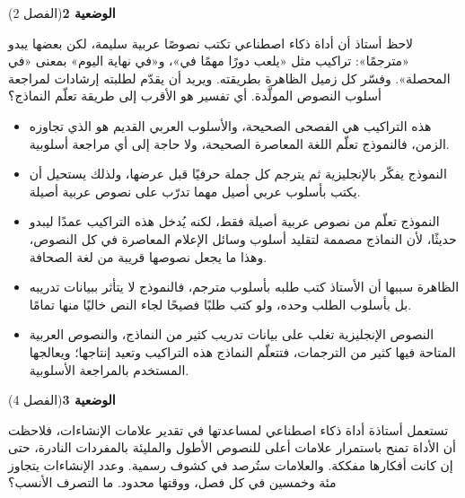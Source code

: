 \documentclass[11pt,a4paper]{article}
\begin{document}
\par\vspace{6pt}
\noindent
{\large\khatt\textbf{الوضعية 2}}\hfill{\small(الفصل 2)}\par\nopagebreak\vspace{3pt}
\setlength{\fboxsep}{7pt}\colorbox{gray!10}{\parbox{\dimexpr\linewidth-14pt}{لاحظ أستاذ أن أداة ذكاء اصطناعي تكتب نصوصًا عربية سليمة، لكن بعضها يبدو «مترجمًا»: تراكيب مثل «يلعب دورًا مهمًا في»، و«في نهاية اليوم» بمعنى «في المحصلة». وفسّر كل زميل الظاهرة بطريقته. ويريد أن يقدّم لطلبته إرشادات لمراجعة أسلوب النصوص المولَّدة. أي تفسير هو الأقرب إلى طريقة تعلّم النماذج؟}}\par\nopagebreak
\begin{itemize}[leftmargin=1.0cm, labelsep=6pt, itemsep=3pt, topsep=4pt, parsep=0pt]
  \item[\textbf{أ)}] هذه التراكيب هي الفصحى الصحيحة، والأسلوب العربي القديم هو الذي تجاوزه الزمن، فالنموذج تعلّم اللغة المعاصرة الصحيحة، ولا حاجة إلى أي مراجعة أسلوبية.
  \item[\textbf{ب)}] النموذج يفكّر بالإنجليزية ثم يترجم كل جملة حرفيًا قبل عرضها، ولذلك يستحيل أن يكتب بأسلوب عربي أصيل مهما تدرّب على نصوص عربية أصيلة.
  \item[\textbf{ج)}] النموذج تعلّم من نصوص عربية أصيلة فقط، لكنه يُدخل هذه التراكيب عمدًا ليبدو حديثًا، لأن النماذج مصممة لتقليد أسلوب وسائل الإعلام المعاصرة في كل النصوص، وهذا ما يجعل نصوصها قريبة من لغة الصحافة.
  \item[\textbf{د)}] الظاهرة سببها أن الأستاذ كتب طلبه بأسلوب مترجم، فالنموذج لا يتأثر ببيانات تدريبه بل بأسلوب الطلب وحده، ولو كتب طلبًا فصيحًا لجاء النص خاليًا منها تمامًا.
  \item[\textbf{هـ)}] النصوص الإنجليزية تغلب على بيانات تدريب كثير من النماذج، والنصوص العربية المتاحة فيها كثير من الترجمات، فتتعلّم النماذج هذه التراكيب وتعيد إنتاجها؛ ويعالجها المستخدم بالمراجعة الأسلوبية.
\end{itemize}
\par\vspace{6pt}
\noindent
{\large\khatt\textbf{الوضعية 3}}\hfill{\small(الفصل 4)}\par\nopagebreak\vspace{3pt}
\setlength{\fboxsep}{7pt}\colorbox{gray!10}{\parbox{\dimexpr\linewidth-14pt}{تستعمل أستاذة أداة ذكاء اصطناعي لمساعدتها في تقدير علامات الإنشاءات، فلاحظت أن الأداة تمنح باستمرار علامات أعلى للنصوص الأطول والمليئة بالمفردات النادرة، حتى إن كانت أفكارها مفككة. والعلامات ستُرصد في كشوف رسمية. وعدد الإنشاءات يتجاوز مئة وخمسين في كل فصل، ووقتها محدود. ما التصرف الأنسب؟}}\par\nopagebreak
\end{document}
